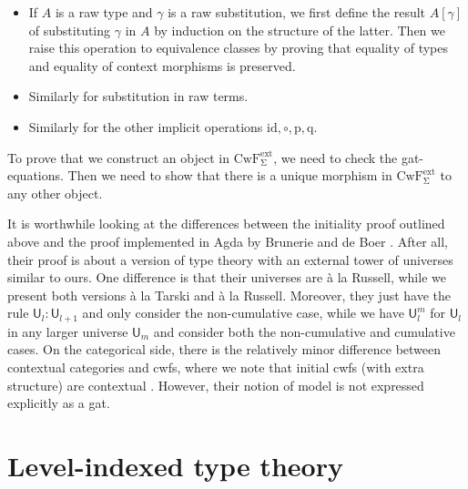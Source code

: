 \documentclass[11pt,a4paper]{article}
\theoremstyle{plain}
\theoremstyle{definition}
\newcommand{\id}{\mathsf{id}}
\newcommand{\UU}{\mathsf{U}}
\def\UU{\mathsf{U}}
\def\id{\mathrm{id}}
\def\p{\mathrm{p}}
\def\q{\mathrm{q}}
\def\CwFext{\mathrm{CwF^{ext}_\Sigma}}
\begin{document}
\begin{itemize}
\item If $A$ is a raw type and $\gamma$ is a raw substitution, we first define the result $A[\gamma]$ of substituting $\gamma$ in $A$ by induction on the structure of the latter. Then we raise this operation to equivalence classes by proving that equality of types and equality of context morphisms is preserved.
\item Similarly for substitution in raw terms.
\item Similarly for the other implicit operations $\id, \circ, \p, \q$.
\end{itemize}
To prove that we construct an object in $\CwFext$, we need to check the gat-equations. Then we need to show that there is a unique morphism in $\CwFext$ to any other object.

It is worthwhile looking at the differences between the initiality proof outlined above and the proof implemented in Agda by Brunerie and de Boer \cite{Brunerie:initiality,deBoer:lic}. After all, their proof is about a version of type theory with an external tower of universes similar to ours. One difference is that their universes are \`a la Russell, while we present both versions \`a la Tarski and \`a la Russell. Moreover, they just have the rule $\UU_l : \UU_{l+1}$ and only consider the non-cumulative case, while we have $\UU_l^m$ for $\UU_l$ in any larger universe $\UU_m$ and consider both the non-cumulative and cumulative cases. On the categorical side, there is the relatively minor difference between contextual categories and cwfs, where we note that initial cwfs (with extra structure) are contextual \cite{ClairambaultD11,castellan:lambek}. However, their notion of model is not expressed explicitly as a gat.

\section{Level-indexed type theory}\label{level-indexed-tt}
\end{document}
